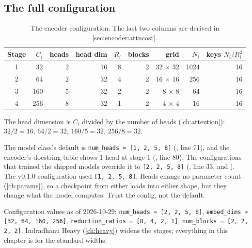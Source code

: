 \subsection{The full configuration}

\begin{table}[htbp]\centering
\caption{The encoder configuration. The last two columns are derived in
\cref{sec:encoder:attncost}.}\label{tab:encoder:config}
\begin{tabular}{@{}crrrrrrrr@{}}\toprule
Stage & $C_i$ & heads & head dim & $R_i$ & blocks & grid & $N_i$ & keys $N_i/R_i^2$ \\\midrule
1 & 32  & 2 & 16 & 8 & 2 & 32 $\times$ 32 & 1024 & 16 \\
2 & 64  & 2 & 32 & 4 & 2 & 16 $\times$ 16 & 256  & 16 \\
3 & 160 & 5 & 32 & 2 & 2 & 8 $\times$ 8   & 64   & 16 \\
4 & 256 & 8 & 32 & 1 & 2 & 4 $\times$ 4   & 16   & 16 \\\bottomrule
\end{tabular}
\end{table}

The head dimension is $C_i$ divided by the number of heads (\cref{ch:attention}):
$32/2 = 16$, $64/2 = 32$, $160/5 = 32$, $256/8 = 32$.

\begin{sourcenote}
The model class's default is \lstinline|num_heads = [1, 2, 5, 8]|
(, line 71), and the encoder's
docstring table shows 1 head at stage 1 (, line 80). The configurations
that trained the shipped models override it to \lstinline|[2, 2, 5, 8]|
(, line 33, and
). The v0.1.0
configuration used \lstinline|[1, 2, 5, 8]|. Heads change no parameter count (\cref{ch:params}), so a
checkpoint from either loads into either shape, but they change what the model computes. Trust the
config, not the default.
\end{sourcenote}

\begin{drift}
Configuration values as of 2026-10-29: \lstinline|num_heads = [2, 2, 5, 8]|,
\lstinline|embed_dims = [32, 64, 160, 256]|, \lstinline|reduction_ratios = [8, 4, 2, 1]|,
\lstinline|num_blocks = [2, 2, 2, 2]|.
Indradhanu Heavy (\cref{ch:heavy}) widens the stages; everything in this chapter is for the
standard widths.
\end{drift}


